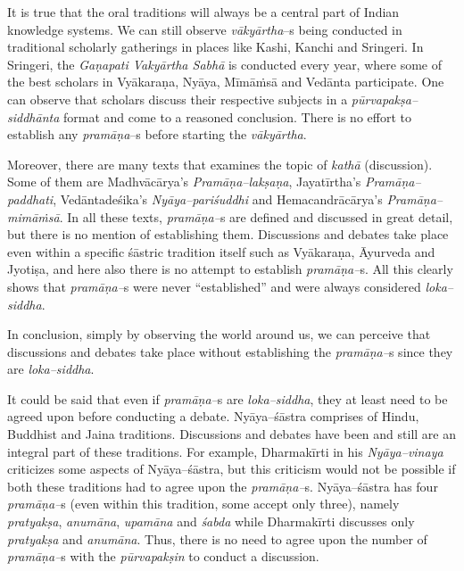 It is true that the oral traditions will always be a central part of Indian knowledge systems. We can still observe \textit{vākyārtha}–s being conducted in traditional scholarly gatherings in places like Kashi, Kanchi and Sringeri. In Sringeri, the \textit{Gaṇapati Vakyārtha Sabhā} is conducted every year, where some of the best scholars in Vyākaraṇa, Nyāya, Mīmāṁsā and Vedānta participate. One can observe that scholars discuss their respective subjects in a \textit{pūrvapakṣa–siddhānta} format and come to a reasoned conclusion. There is no effort to establish any \textit{pramāṇa}–s before starting the \textit{vākyārtha}.

Moreover, there are many texts that examines the topic of \textit{kathā} (discussion). Some of them are Madhvācārya’s \textit{Pramāṇa–lakṣaṇa}, Jayatīrtha’s \textit{Pramāṇa–paddhati}, Vedāntadeśika’s \textit{Nyāya–pariśuddhi} and Hemacandrācārya’s \textit{Pramāṇa–mimāṁsā}. In all these texts, \textit{pramāṇa–}s are defined and discussed in great detail, but there is no mention of establishing them. Discussions and debates take place even within a specific śāstric tradition itself such as Vyākaraṇa, Āyurveda and Jyotiṣa, and here also there is no attempt to establish \textit{pramāṇa–}s. All this clearly shows that \textit{pramāṇa–}s were never “established” and were always considered \textit{loka–siddha}.

In conclusion, simply by observing the world around us, we can perceive that discussions and debates take place without establishing the \textit{pramāṇa–}s since they are \textit{loka–siddha}.

It could be said that even if \textit{pramāṇa–}s are \textit{loka–siddha}, they at least need to be agreed upon before conducting a debate. Nyāya–śāstra comprises of Hindu, Buddhist and Jaina traditions. Discussions and debates have been and still are an integral part of these traditions. For example, Dharmakīrti in his \textit{Nyāya–vinaya} criticizes some aspects of Nyāya–śāstra, but this criticism would not be possible if both these traditions had to agree upon the \textit{pramāṇa–}s. Nyāya–śāstra has four \textit{pramāṇa–}s (even within this tradition, some accept only three), namely \textit{pratyakṣa}, \textit{anumāna}, \textit{upamāna} and \textit{śabda} while Dharmakīrti discusses only \textit{pratyakṣa} and \textit{anumāna}. Thus, there is no need to agree upon the number of \textit{pramāṇa–}s with the \textit{pūrvapakṣin} to conduct a discussion.

